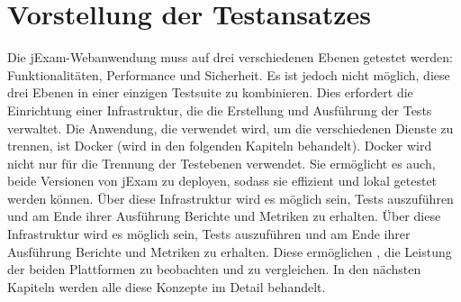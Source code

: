 \section{Vorstellung der Testansatzes}

Die jExam-Webanwendung muss auf drei verschiedenen Ebenen getestet
werden: Funktionalitäten, Performance und Sicherheit. Es ist jedoch
nicht möglich, diese drei Ebenen in einer einzigen Testsuite zu
kombinieren. Dies erfordert die Einrichtung einer Infrastruktur,
die die Erstellung und Ausführung der Tests verwaltet. Die Anwendung,
die verwendet wird, um die verschiedenen Dienste zu trennen, ist Docker \cite{docker}
(wird in den folgenden Kapiteln behandelt). Docker  wird nicht nur für
die Trennung der Testebenen verwendet. Sie ermöglicht es auch, beide
Versionen von jExam zu deployen, sodass sie effizient und lokal
getestet werden können. Über diese Infrastruktur wird es möglich
sein, Tests auszuführen und am Ende ihrer Ausführung Berichte und
Metriken zu erhalten. Über diese Infrastruktur wird es möglich sein,
Tests auszuführen und am Ende ihrer Ausführung Berichte und Metriken
zu erhalten. Diese ermöglichen , die Leistung der beiden Plattformen
zu beobachten und zu vergleichen. In den nächsten Kapiteln werden
alle diese Konzepte im Detail behandelt.


